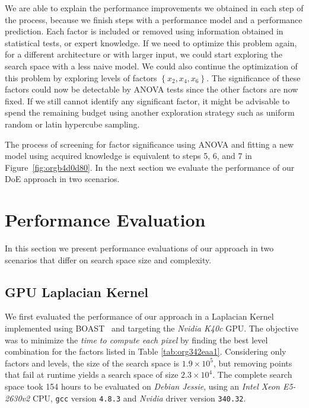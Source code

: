 \documentclass[conference]{IEEEtran}
\begin{document}
We are able to explain the performance  improvements we obtained in each step of
the process, because we finish steps  with a performance model and a performance
prediction. Each  factor is  included or removed  using information  obtained in
statistical tests,  or expert  knowledge. If  we need  to optimize  this problem
again,  for a  different  architecture  or with  larger  input,  we could  start
exploring the search space  with a less naive model. We  could also continue the
optimization    of   this    problem    by   exploring    levels   of    factors
\(\left\{x_2,x_4,x_6\right\}\).   The  significance of  these  factors  could now  be
detectable by  ANOVA tests since  the other factors are  now fixed. If  we still
cannot  identify any  significant factor,  it might  be advisable  to spend  the
remaining budget  using another exploration  strategy such as uniform  random or
latin hypercube sampling.

The process of  screening for factor significance using ANOVA  and fitting a new
model  using  acquired  knowledge  is  equivalent  to  steps  5,  6,  and  7  in
Figure~\ref{fig:orgb4d0d80}. In  the next section we  evaluate the performance
of our DoE approach in two scenarios.
\section{Performance Evaluation}
\label{sec:org291a13b}
In  this section  we  present performance  evaluations of  our  approach in  two
scenarios that differ on search space size and complexity.
\vspace{-5pt}
\subsection{GPU Laplacian Kernel}
\label{sec:org6195140}
We  first evaluated  the  performance  of our  approach  in  a Laplacian  Kernel
implemented  using BOAST~\cite{videau2017boast}  and targeting  the \emph{Nvidia  K40c}
GPU. The objective was to minimize the \emph{time to compute each pixel} by finding the
best    level     combination    for    the    factors     listed    in    Table
\ref{tab:org342eaa1}. Considering only factors and  levels, the size of the
search space  is \(1.9\times10^5\), but  removing points that  fail at runtime  yields a
search space of size  \(2.3\times10^4\). The complete search space took  154 hours to be
evaluated  on \emph{Debian  Jessie}, using  an \emph{Intel  Xeon E5-2630v2}  CPU, \texttt{gcc}
version \texttt{4.8.3} and \emph{Nvidia} driver version \texttt{340.32}.
\end{document}
